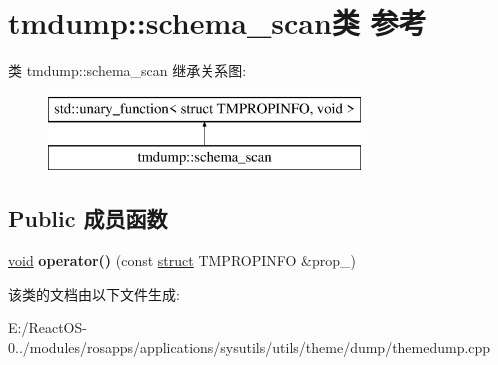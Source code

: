 \hypertarget{classtmdump_1_1schema__scan}{}\section{tmdump\+:\+:schema\+\_\+scan类 参考}
\label{classtmdump_1_1schema__scan}
类 tmdump\+:\+:schema\+\_\+scan 继承关系图\+:\begin{figure}[H]
\begin{center}
\leavevmode
\includegraphics[height=2.000000cm]{classtmdump_1_1schema__scan}
\end{center}
\end{figure}
\subsection*{Public 成员函数}
\begin{DoxyCompactItemize}
\item 
\mbox{\label{classtmdump_1_1schema__scan_a3257542b1304d01d0e3cb85138ac0ee4}} 
\hyperlink{interfacevoid}{void} {\bfseries operator()} (const \hyperlink{interfacestruct}{struct} T\+M\+P\+R\+O\+P\+I\+N\+FO \&prop\+\_\+)
\end{DoxyCompactItemize}


该类的文档由以下文件生成\+:\begin{DoxyCompactItemize}
\item 
E\+:/\+React\+O\+S-\/0../modules/rosapps/applications/sysutils/utils/theme/dump/themedump.\+cpp\end{DoxyCompactItemize}
